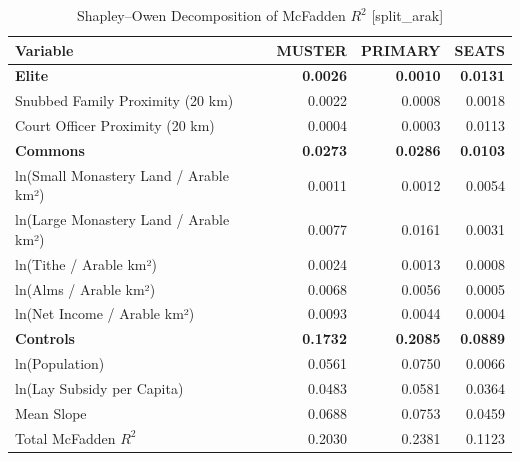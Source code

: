 \begin{table}[H]
\centering
\caption{Shapley--Owen Decomposition of McFadden $R^2$ [split_arak]}
\label{tab:shapley_owen_split_arak}
\begin{tabular}{lrrr}
\hline\hline
Variable & MUSTER & PRIMARY & SEATS \\
\hline
\textbf{Elite} & \textbf{0.0026} & \textbf{0.0010} & \textbf{0.0131} \\
\quad Snubbed Family Proximity (20 km) & 0.0022 & 0.0008 & 0.0018 \\
\quad Court Officer Proximity (20 km) & 0.0004 & 0.0003 & 0.0113 \\
\textbf{Commons} & \textbf{0.0273} & \textbf{0.0286} & \textbf{0.0103} \\
\quad ln(Small Monastery Land / Arable km²) & 0.0011 & 0.0012 & 0.0054 \\
\quad ln(Large Monastery Land / Arable km²) & 0.0077 & 0.0161 & 0.0031 \\
\quad ln(Tithe / Arable km²) & 0.0024 & 0.0013 & 0.0008 \\
\quad ln(Alms / Arable km²) & 0.0068 & 0.0056 & 0.0005 \\
\quad ln(Net Income / Arable km²) & 0.0093 & 0.0044 & 0.0004 \\
\textbf{Controls} & \textbf{0.1732} & \textbf{0.2085} & \textbf{0.0889} \\
\quad ln(Population) & 0.0561 & 0.0750 & 0.0066 \\
\quad ln(Lay Subsidy per Capita) & 0.0483 & 0.0581 & 0.0364 \\
\quad Mean Slope & 0.0688 & 0.0753 & 0.0459 \\
\hline
Total McFadden $R^2$ & 0.2030 & 0.2381 & 0.1123 \\
\hline\hline
\end{tabular}
\end{table}
